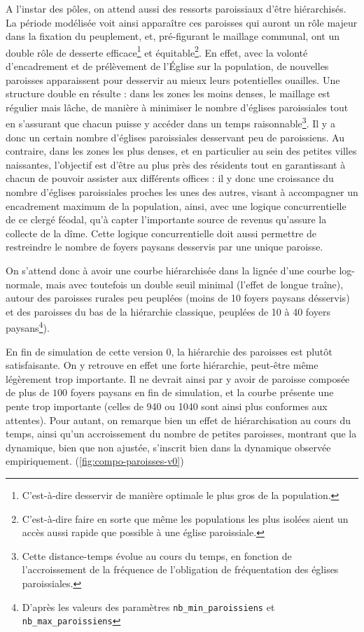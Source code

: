 A l'instar des pôles, on attend aussi des ressorts paroissiaux d'être hiérarchisés. La période modélisée voit ainsi apparaître ces paroisses qui auront un rôle majeur dans la fixation du peuplement, et, pré-figurant le maillage communal, ont un double rôle de desserte efficace\footnote{C'est-à-dire desservir de manière optimale le plus gros de la population.} et équitable\footnote{C'est-à-dire faire en sorte que même les populations les plus isolées aient un accès aussi rapide que possible à une église paroissiale.}.
En effet, avec la volonté d'encadrement et de prélèvement de l'Église sur la population, de nouvelles paroisses apparaissent pour desservir au mieux leurs potentielles ouailles.
Une structure double en résulte : dans les zones les moins denses, le maillage est régulier mais lâche, de manière à minimiser le nombre d'églises paroissiales tout en s'assurant que chacun puisse y accéder dans un temps raisonnable\footnote{Cette distance-temps évolue au cours du temps, en fonction de l'accroissement de la fréquence de l'obligation de fréquentation des églises paroissiales.}. Il y a donc un certain nombre d'églises paroissiales desservant peu de paroissiens.
Au contraire, dans les zones les plus denses, et en particulier au sein des petites villes naissantes, l'objectif est d'être au plus près des résidents tout en garantissant à chacun de pouvoir assister aux différents offices : il y donc une croissance du nombre d'églises paroissiales proches les unes des autres, visant à accompagner un encadrement maximum de la population, ainsi, avec une logique concurrentielle de ce clergé féodal, qu'à capter l'importante source de revenus qu'assure la collecte de la dîme. Cette logique concurrentielle doit aussi permettre de restreindre le nombre de foyers paysans desservis par une unique paroisse. 

On s'attend donc à avoir une courbe hiérarchisée dans la lignée d'une courbe log-normale, mais avec toutefois un double seuil minimal (l'effet de \og longue traîne\fg{}), autour des paroisses \og rurales\fg{} peu peuplées (moins de 10 foyers paysans désservis) et des paroisses du bas de la hiérarchie classique, peuplées de 10 à 40 foyers paysans\footnote{D'après les valeurs des paramètres \texttt{nb\_min\_paroissiens} et \texttt{nb\_max\_paroissiens}}).


\begin{mdframed}[backgroundcolor=gray!10,footnoteinside=false]
	En fin de simulation de cette version 0, la hiérarchie des paroisses est plutôt satisfaisante. On y retrouve en effet une forte hiérarchie, peut-être même légèrement trop importante. Il ne devrait ainsi par y avoir de paroisse composée de plus de $100$ foyers paysans en fin de simulation, et la courbe présente une pente trop importante (celles de 940 ou 1040 sont ainsi plus conformes aux attentes).
	Pour autant, on remarque bien un effet de hiérarchisation au cours du temps, ainsi qu'un accroissement du nombre de petites paroisses, montrant que la dynamique, bien que non ajustée, s'inscrit bien dans la dynamique observée empiriquement.
	(\cref{fig:compo-paroisses-v0})
\end{mdframed}

